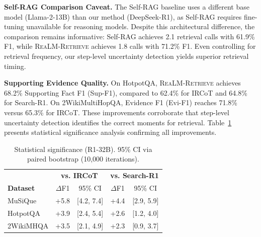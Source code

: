 \documentclass[sigconf,natbib=true]{acmart}
\newcommand{\methodname}{\textsc{ReaLM-Retrieve}}
\begin{document}
\textbf{Self-RAG Comparison Caveat.} The Self-RAG baseline uses a different base model (Llama-2-13B) than our method (DeepSeek-R1), as Self-RAG requires fine-tuning unavailable for reasoning models. Despite this architectural difference, the comparison remains informative: Self-RAG achieves 2.1 retrieval calls with 61.9\% F1, while \methodname{} achieves 1.8 calls with 71.2\% F1. Even controlling for retrieval frequency, our step-level uncertainty detection yields superior retrieval timing.

\textbf{Supporting Evidence Quality.} On HotpotQA, \methodname{} achieves 68.2\% Supporting Fact F1 (Sup-F1), compared to 62.4\% for IRCoT and 64.8\% for Search-R1. On 2WikiMultiHopQA, Evidence F1 (Evi-F1) reaches 71.8\% versus 65.3\% for IRCoT. These improvements corroborate that step-level uncertainty detection identifies the correct moments for retrieval. Table~\ref{tab:significance} presents statistical significance analysis confirming all improvements.

\begin{table}[t]
\small
\centering
\caption{Statistical significance (R1-32B). 95\% CI via paired bootstrap (10,000 iterations).}
\label{tab:significance}
\begin{tabular}{@{}l|cc|cc@{}}
\toprule
& \multicolumn{2}{c|}{\textbf{vs. IRCoT}} & \multicolumn{2}{c}{\textbf{vs. Search-R1}} \\
\textbf{Dataset} & $\Delta$F1 & 95\% CI & $\Delta$F1 & 95\% CI \\
\midrule
MuSiQue & +5.8 & [4.2, 7.4] & +4.4 & [2.9, 5.9] \\
HotpotQA & +3.9 & [2.4, 5.4] & +2.6 & [1.2, 4.0] \\
2WikiMHQA & +3.5 & [2.1, 4.9] & +2.3 & [0.9, 3.7] \\
\bottomrule
\end{tabular}
\end{table}
\end{document}
